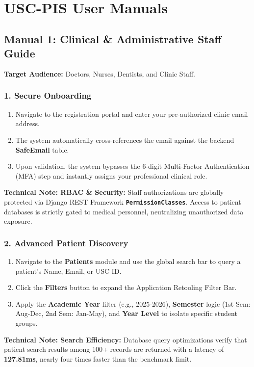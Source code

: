 
\chapter{USC-PIS User Manuals}
\label{appendix:user_manuals}

\section{Manual 1: Clinical \& Administrative Staff Guide}

\textbf{Target Audience:} Doctors, Nurses, Dentists, and Clinic Staff.

\subsection{1. Secure Onboarding}
\begin{enumerate}
    \item Navigate to the registration portal and enter your pre-authorized clinic email address.
    \item The system automatically cross-references the email against the backend \textbf{SafeEmail} table.
    \item Upon validation, the system bypasses the 6-digit Multi-Factor Authentication (MFA) step and instantly assigns your professional clinical role.
\end{enumerate}
\textbf{Technical Note: RBAC \& Security:} Staff authorizations are globally protected via Django REST Framework \textbf{\texttt{PermissionClasses}}. Access to patient databases is strictly gated to medical personnel, neutralizing unauthorized data exposure.

\subsection{2. Advanced Patient Discovery}
\begin{enumerate}
    \item Navigate to the \textbf{Patients} module and use the global search bar to query a patient's Name, Email, or USC ID.
    \item Click the \textbf{Filters} button to expand the Application Retooling Filter Bar.
    \item Apply the \textbf{Academic Year} filter (e.g., 2025-2026), \textbf{Semester} logic (1st Sem: Aug-Dec, 2nd Sem: Jan-May), and \textbf{Year Level} to isolate specific student groups.
\end{enumerate}
\textbf{Technical Note: Search Efficiency:} Database query optimizations verify that patient search results among 100+ records are returned with a latency of \textbf{127.81ms}, nearly four times faster than the benchmark limit.

